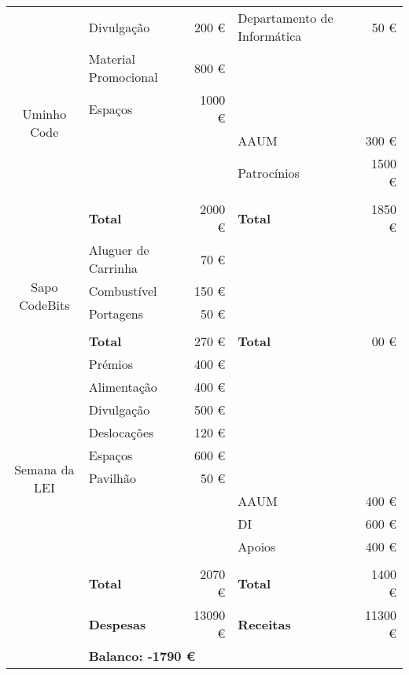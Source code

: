 \begin{center}
{\begin{tabular}{| c | l | r | l | r |}
\multirow{7}{*}{Uminho Code}
							& Divulgação		 	& 200 \euro		& Departamento de Informática 	& 50 \euro			\\ \cline{2-5}
							& Material Promocional	& 800 \euro		& 								&					\\ \cline{2-5}
							& Espaços			 	& 1000 \euro	&  								& 					\\ \cline{2-5}
							&						&				& AAUM							& 300 \euro		\\ \cline{2-5}
							&						&				& Patrocínios					& 1500 \euro		\\ \cline{2-5}
							&						&				&								&					\\ \cline{2-5}
							& \textbf{Total}		& 2000 \euro		& \textbf{Total}				& 1850 \euro			\\ \cline{1-5} \hline

\multirow{5}{*}{Sapo CodeBits}
							& Aluguer de Carrinha 	& 70 \euro		& 								&					\\ \cline{2-5}
							& Combustível		 	& 150 \euro		& 								&					\\ \cline{2-5}
							& Portagens			 	& 50 \euro		& 								&					\\ \cline{2-5}
							&						&				&								&					\\ \cline{2-5}
							& \textbf{Total}		& 270 \euro		& \textbf{Total}				& 00 \euro			\\ \cline{1-5} \hline

\multirow{11}{*}{Semana da LEI}
							& Prémios			 	& 400 \euro		& 								&					\\ \cline{2-5}
							& Alimentação		 	& 400 \euro		& 								&					\\ \cline{2-5}
							& Divulgação		 	& 500 \euro		& 								&					\\ \cline{2-5}
							& Deslocações		 	& 120 \euro		& 								&					\\ \cline{2-5}
							& Espaços			 	& 600 \euro		& 								&					\\ \cline{2-5}
							& Pavilhão			 	& 50 \euro		& 								&					\\ \cline{2-5}
							&						&				& AAUM							& 400 \euro		\\ \cline{2-5}
							&						&				& DI							& 600 \euro		\\ \cline{2-5}
							&						&				& Apoios						& 400 \euro		\\ \cline{2-5}
							&						&				&								&					\\ \cline{2-5}
							& \textbf{Total}		& 2070 \euro		& \textbf{Total}				& 1400 \euro			\\ \cline{1-5} \hline
			
\hline
							& \textbf{Despesas}		& 13090 \euro	& \textbf{Receitas}				& 11300 \euro		\\ \hline
							& \multicolumn{4}{|l|}{\textbf{Balanco: -1790 \euro}}															\\ \hline
\end{tabular}
}

\end{center}
